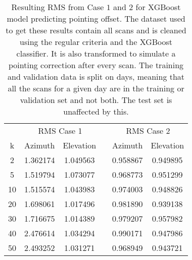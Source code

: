 \begin{table}[h]
    \centering %
    \caption{Resulting RMS from Case $1$ and $2$ for XGBoost model predicting pointing offset.
    The dataset used to get these results contain all scans and is cleaned using the regular criteria and the XGBoost classifier.
    It is also transformed to simulate a pointing correction after every scan.
    The training and validation data is split on days, meaning that all the scans for a given day
    are in the training or validation set and not both. The test set is unaffected by this.}
    \begin{tabular}{ccc c cc}
        \toprule
        \multicolumn{1}{c}{} & \multicolumn{2}{c}{RMS Case 1} & & \multicolumn{2}{c}{RMS Case 2} \\
        \cmidrule(lr){2-3} \cmidrule(lr){5-6}
         k & Azimuth & Elevation & & Azimuth & Elevation \\
        \midrule
        2 &  1.362174 &  1.049563 & &  0.958867 &  0.949895 \\
        5 &  1.519794 &  1.073077 & &  0.968773 &  0.951299 \\
       10 &  1.515574 &  1.043983 & &  0.974003 &  0.948826 \\
       20 &  1.698061 &  1.017496 & &  0.981890 &  0.939138 \\
       30 &  1.716675 &  1.014389 & &  0.979207 &  0.957982 \\
       40 &  2.476614 &  1.034294 & &  0.990171 &  0.947986 \\
       50 &  2.493252 &  1.031271 & &  0.968949 &  0.943721 \\
        \bottomrule
    \end{tabular}        
\end{table}


